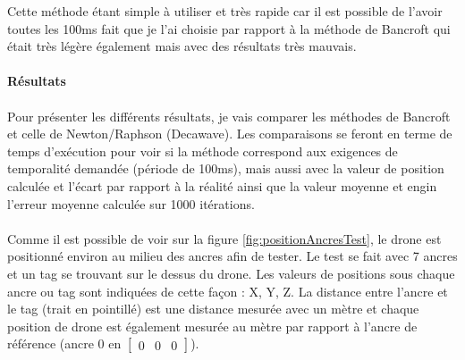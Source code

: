             Cette méthode étant simple à utiliser et très rapide car il est possible de l'avoir toutes les 100ms fait que je l'ai choisie par rapport à la méthode de Bancroft qui était très légère également mais avec des résultats très mauvais.
            
        
        \paragraph{Résultats}
            \paragraph*{}
            Pour présenter les différents résultats, je vais comparer les méthodes de Bancroft et celle de Newton/Raphson (Decawave). Les comparaisons se feront en terme de temps d'exécution pour voir si la méthode correspond aux exigences de temporalité demandée (période de 100ms), mais aussi avec la valeur de position calculée et l'écart par rapport à la réalité ainsi que la valeur moyenne et engin l'erreur moyenne calculée sur 1000 itérations.
            
            \paragraph*{}
            Comme il est possible de voir sur la figure \ref{fig:positionAncresTest}, le drone est positionné environ au milieu des ancres afin de tester. Le test se fait avec 7 ancres et un tag se trouvant sur le dessus du drone. Les valeurs de positions sous chaque ancre ou tag sont indiquées de cette façon : X, Y, Z. La distance entre l'ancre et le tag (trait en pointillé) est une distance mesurée avec un mètre et chaque position de drone est également mesurée au mètre par rapport à l'ancre de référence (ancre 0 en $\begin{bmatrix}0 & 0 & 0\end{bmatrix}$).
            
